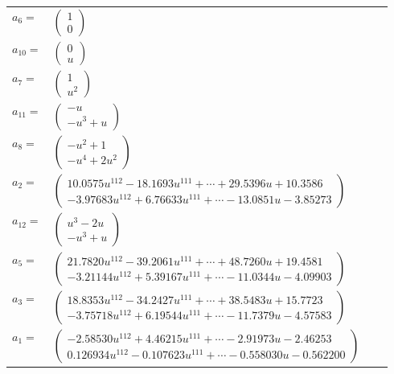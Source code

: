 \documentclass[1p]{elsarticle_modified}
\theoremstyle{definition}
\begin{document}
\begin{tabular}{m{7pt} m{180pt} m{7pt} m{180pt} }
\flushright $a_{6}=$&$\begin{pmatrix}1\\0\end{pmatrix}$ \\
\flushright $a_{10}=$&$\begin{pmatrix}0\\u\end{pmatrix}$ \\
\flushright $a_{7}=$&$\begin{pmatrix}1\\u^2\end{pmatrix}$ \\
\flushright $a_{11}=$&$\begin{pmatrix}- u\\- u^3+u\end{pmatrix}$ \\
\flushright $a_{8}=$&$\begin{pmatrix}- u^2+1\\- u^4+2 u^2\end{pmatrix}$ \\
\flushright $a_{2}=$&$\begin{pmatrix}10.0575 u^{112}-18.1693 u^{111}+\cdots+29.5396 u+10.3586\\-3.97683 u^{112}+6.76633 u^{111}+\cdots-13.0851 u-3.85273\end{pmatrix}$ \\
\flushright $a_{12}=$&$\begin{pmatrix}u^3-2 u\\- u^3+u\end{pmatrix}$ \\
\flushright $a_{5}=$&$\begin{pmatrix}21.7820 u^{112}-39.2061 u^{111}+\cdots+48.7260 u+19.4581\\-3.21144 u^{112}+5.39167 u^{111}+\cdots-11.0344 u-4.09903\end{pmatrix}$ \\
\flushright $a_{3}=$&$\begin{pmatrix}18.8353 u^{112}-34.2427 u^{111}+\cdots+38.5483 u+15.7723\\-3.75718 u^{112}+6.19544 u^{111}+\cdots-11.7379 u-4.57583\end{pmatrix}$ \\
\flushright $a_{1}=$&$\begin{pmatrix}-2.58530 u^{112}+4.46215 u^{111}+\cdots-2.91973 u-2.46253\\0.126934 u^{112}-0.107623 u^{111}+\cdots-0.558030 u-0.562200\end{pmatrix}$ \\

\end{tabular}
\end{document}
